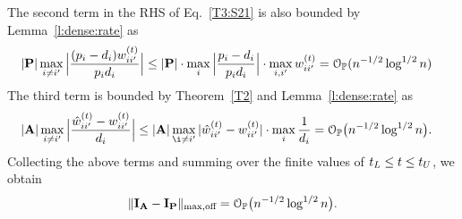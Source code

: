 \documentclass[10pt,journal,compsoc]{IEEEtran}
\newcommand{\op}{\mathcal{O}_{\mathbb{P}}}
\newcommand{\ee}{\end{aligned} \end{equation}}
\newcommand{\bee}{\begin{equation}\begin{aligned}}
\newcommand{\M}[1]{{{\mathbf{\MakeUppercase{#1}}}}}
\numberwithin{equation}{section}
\begin{document}
The second term in the RHS of Eq.~\eqref{T3:S21} is also bounded by
Lemma~\ref{l:dense:rate} as
\bee\label{T3:S24}
|\M P|\max_{i \neq {i'}}\Big|\frac{(p_i - d_i)w^{(t)}_{ii'}}{p_i d_i} \Big| & \leq |\M P|\cdot \max_{i} \Big|\frac{p_i - d_i}{p_id_i}\Big|\cdot \max_{i,i'} w^{(t)}_{ii'}
= \op(n^{-1/2}\log^{1/2}{n})
\ee
The third term is bounded by Theorem~\ref{T2} and Lemma~\ref{l:dense:rate} as
\bee\nonumber
|\M A|  \max_{i \neq {i'}}\Big|\frac{\hat{w}_{ii'}^{(t)} -
  w_{ii'}^{(t)}}{d_i}\Big|
 \leq |\M A| \max_{\i \neq {i'}}|\hat{w}_{ii'}^{(t)} - w^{(t)}_{ii'}|\cdot \max_{i}\frac{1}{d_i}
& = %
\op\big(n^{-1/2}\log^{1/2}{n}\big).
\ee
Collecting the above terms and summing over the finite values of ${\color{black}t_L \leq t \leq t_U}$, we obtain
\bee\label{T3:S2f}
\|\M I_{\M A} - \M I_{\M P}\|_{\max,\text{off}} =
\op\big(n^{-1/2}\log^{1/2}{n}\big).
\ee
\end{document}
